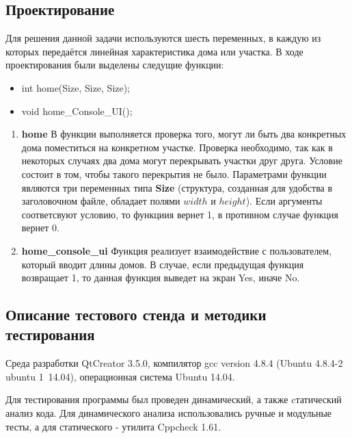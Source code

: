\documentclass[12pt,a4paper]{report}
\begin{document}
\subsection{Проектирование}
\hspace{\parindent}
Для решения данной задачи используются шесть переменных, в каждую из которых передаётся линейная характеристика дома или участка.
В ходе проектирования были выделены следущие функции:

\begin{itemize}
\item int home(Size, Size, Size);
\item void home\_Console\_UI();
\end{itemize}

\begin{enumerate}
		\item \textbf{home}
	В  функции выполняется проверка того, могут ли быть два конкретных дома поместиться на конкретном  участке. Проверка необходимо, так как в некоторых случаях два дома могут перекрывать участки друг друга. Условие состоит в том, чтобы такого перекрытия не было.
	Параметрами функции являются три переменных типа \textbf{Size} (структура, созданная для удобства в заголовочном файле, обладает полями $width$ и $height$). Если аргументы соответсвуют условию, то функциия вернет 1, в противном случае функция вернет 0.
	
		\item \textbf{home\_console\_ui}
	Функция реализует взаимодействие с пользователем, который вводит длины домов. В случае, если предыдущая функция возвращает 1, то данная функция выведет на экран Yes, иначе No.
\end{enumerate}

\subsection{Описание тестового стенда и методики тестирования}
\hspace{\parindent}
Среда разработки QtCreator 3.5.0, компилятор gcc version 4.8.4 (Ubuntu 4.8.4-2 ubuntu 1~14.04), операционная система Ubuntu 14.04. 

Для тестирования программы был проведен динамический, а также cтатический анализ кода. Для динамического анализа использовались ручные и модульные тесты, а для статического - утилита Cppcheck 1.61.
\end{document}
